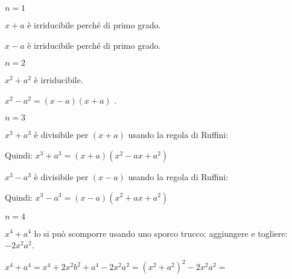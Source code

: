 \begin{itemize*}
\item $n=1$
 \begin{itemize*}
  \item $x+a$ è irriducibile perché di primo grado.
  \item $x-a$ è irriducibile perché di primo grado.
 \end{itemize*}

 \item $n=2$
 \begin{itemize*}
  \item $x^2+a^2$ è irriducibile.
  \item $x^2-a^2=(x-a)(x+a)$ .
 \end{itemize*}

 \item $n=3$
 \begin{itemize*}
  \item 
 \begin{multicols}{2}
  $x^3+a^3$ è divisibile per $(x+a)$ usando la regola di Ruffini:
   \begin{inaccessibleblock}
    \begin{center}
    
    \end{center}
    \end{inaccessibleblock}
 \end{multicols}
   Quindi: $x^3+a^3=(x+a)(x^2-ax+a^2)$
  \item 
 \begin{multicols}{2}
  $x^3-a^3$ è divisibile per $(x-a)$ usando la regola di Ruffini:
   \begin{inaccessibleblock}
    \begin{center}
    
    \end{center}
    \end{inaccessibleblock}
 \end{multicols}
   Quindi: $x^3-a^3=(x-a)(x^2+ax+a^2)$
 \end{itemize*}

 \item $n=4$
 \begin{itemize*}
  \item $x^4+a^4$ lo si può scomporre usando uno sporco trucco: 
   aggiungere e togliere:~$-2x^2a^2$.
   
   $x^4+a^4 = x^4+2x^2b^2+a^4-2x^2a^2 = (x^2+a^2)^2-2x^2a^2=$
   

\end{itemize*}
\end{itemize*}

